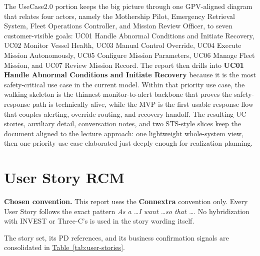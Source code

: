 \documentclass[10pt,a4paper]{article}
\let\orighyperref\hyperref
\renewcommand{\hyperref}[2][]{\orighyperref[#1]{\uline{#2}}}
\begin{document}
The UseCase2.0 portion keeps the big picture through one GPV-aligned diagram that relates four actors, namely the Mothership Pilot, Emergency Retrieval System, Fleet Operations Controller, and Mission Review Officer, to seven customer-visible goals: UC01 Handle Abnormal Conditions and Initiate Recovery, UC02 Monitor Vessel Health, UC03 Manual Control Override, UC04 Execute Mission Autonomously, UC05 Configure Mission Parameters, UC06 Manage Fleet Mission, and UC07 Review Mission Record. The report then drills into \textbf{UC01 Handle Abnormal Conditions and Initiate Recovery} because it is the most safety-critical use case in the current model. Within that priority use case, the walking skeleton is the thinnest monitor-to-alert backbone that proves the safety-response path is technically alive, while the MVP is the first usable response flow that couples alerting, override routing, and recovery handoff. The resulting UC stories, auxiliary detail, conversation notes, and two STS-style slices keep the document aligned to the lecture approach: one lightweight whole-system view, then one priority use case elaborated just deeply enough for realization planning.


\section{User Story RCM}
\label{sec:user-story-rcm}

\textbf{Chosen convention.} This report uses the \textbf{Connextra} convention only. Every User Story follows the exact pattern \textit{As a \dots I want \dots so that \dots}. No hybridization with INVEST or Three-C's is used in the story wording itself.

The story set, its PD references, and its business confirmation signals are consolidated in \hyperref[tab:user-stories]{Table~\ref*{tab:user-stories}}.
\end{document}

